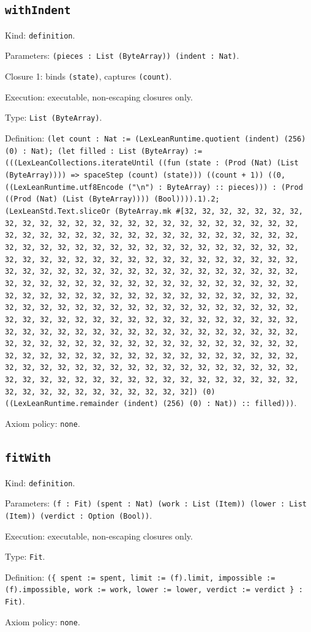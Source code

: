 \documentclass[11pt]{article}
\begin{document}
\subsection*{\texttt{withIndent}}
\noindent Kind: \texttt{definition}.\par
\noindent Parameters: \texttt{(pieces : List (ByteArray)) (indent : Nat)}.\par
\noindent Closure 1: binds \texttt{(state)}, captures \texttt{(count)}.\par
\noindent Execution: executable, non-escaping closures only.\par
\noindent Type: \texttt{List (ByteArray)}.\par
\noindent Definition: \texttt{(let count : Nat := (LexLeanRuntime.quotient (indent) (256) (0) : Nat); (let filled : List (ByteArray) := (((LexLeanCollections.iterateUntil ((fun (state : (Prod (Nat) (List (ByteArray)))) => spaceStep (count) (state))) ((count + 1)) ((0, ((LexLeanRuntime.utf8Encode ("\textbackslash{}n") : ByteArray) :: pieces))) : (Prod ((Prod (Nat) (List (ByteArray)))) (Bool)))).1).2; (LexLeanStd.Text.sliceOr (ByteArray.mk \#[32, 32, 32, 32, 32, 32, 32, 32, 32, 32, 32, 32, 32, 32, 32, 32, 32, 32, 32, 32, 32, 32, 32, 32, 32, 32, 32, 32, 32, 32, 32, 32, 32, 32, 32, 32, 32, 32, 32, 32, 32, 32, 32, 32, 32, 32, 32, 32, 32, 32, 32, 32, 32, 32, 32, 32, 32, 32, 32, 32, 32, 32, 32, 32, 32, 32, 32, 32, 32, 32, 32, 32, 32, 32, 32, 32, 32, 32, 32, 32, 32, 32, 32, 32, 32, 32, 32, 32, 32, 32, 32, 32, 32, 32, 32, 32, 32, 32, 32, 32, 32, 32, 32, 32, 32, 32, 32, 32, 32, 32, 32, 32, 32, 32, 32, 32, 32, 32, 32, 32, 32, 32, 32, 32, 32, 32, 32, 32, 32, 32, 32, 32, 32, 32, 32, 32, 32, 32, 32, 32, 32, 32, 32, 32, 32, 32, 32, 32, 32, 32, 32, 32, 32, 32, 32, 32, 32, 32, 32, 32, 32, 32, 32, 32, 32, 32, 32, 32, 32, 32, 32, 32, 32, 32, 32, 32, 32, 32, 32, 32, 32, 32, 32, 32, 32, 32, 32, 32, 32, 32, 32, 32, 32, 32, 32, 32, 32, 32, 32, 32, 32, 32, 32, 32, 32, 32, 32, 32, 32, 32, 32, 32, 32, 32, 32, 32, 32, 32, 32, 32, 32, 32, 32, 32, 32, 32, 32, 32, 32, 32, 32, 32, 32, 32, 32, 32, 32, 32, 32, 32, 32, 32, 32, 32, 32, 32, 32, 32, 32, 32, 32, 32, 32, 32, 32, 32]) (0) ((LexLeanRuntime.remainder (indent) (256) (0) : Nat)) :: filled)))}.\par
\noindent Axiom policy: \texttt{none}.\par
\subsection*{\texttt{fitWith}}
\noindent Kind: \texttt{definition}.\par
\noindent Parameters: \texttt{(f : Fit) (spent : Nat) (work : List (Item)) (lower : List (Item)) (verdict : Option (Bool))}.\par
\noindent Execution: executable, non-escaping closures only.\par
\noindent Type: \texttt{Fit}.\par
\noindent Definition: \texttt{(\{ spent := spent, limit := (f).limit, impossible := (f).impossible, work := work, lower := lower, verdict := verdict \} : Fit)}.\par
\noindent Axiom policy: \texttt{none}.\par
\end{document}
